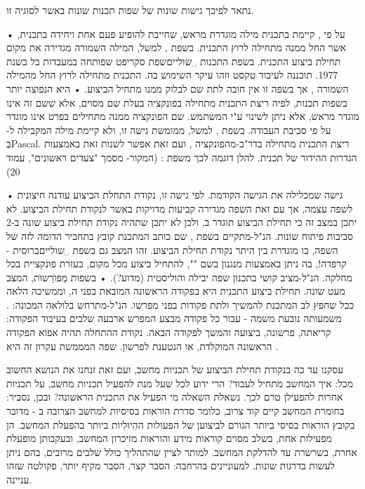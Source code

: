 נתאר לפיכך גישות שונות של שפות תכנות שונות באשר לסוגיה זו.
\begin{enumerate}
• על פי , קיימת בתכנית מילה מוגדרת מראש, שחייבת להופיע פעם אחת ויחידה בתכנית, אשר החל ממנה מתחילה לרוץ התכנית. בשפת , למשל, המילה השמורה  מגדירה את מקום תחילת ביצוע התכנית. בשפת התכנות ␣שוליים{שפת סקריפט שפותחה במעבדות בל בשנת 1977. תוכננה לעיבוד טקסט וזהו עיקר השימוש בה.} התכנית מתחילה לרוץ החל מהמילה השמורה , אך בשפה זו אין חובה לתת שם לבלוק ממנו מתחיל הביצוע.
•   היא הנפוצה יותר בשפות תכנות, לפיה ריצת התכנית מתחילה בפונקציה בעלת שם מסוים, אלא ששם זה אינו מוגדר מראש, אלא ניתן לשינוי ע"י המשתמש. שם הפונקציה ממנה מתחילים
בפרט אינו מוגדר על פי סביבת העבודה. בשפת , למשל, ממומשת גישה זו, ולא קיימת מילה המקבילה
ל- בְּPascal. ריצת התכנית מתחילה בדר"כ-מהפונקציה , ועם זאת אפשר לשנות זאת באמצעות
הגדרות ההידור של תכנית. להלן דוגמה לכך משפת : (המקור- מסמך "צעדים ראשונים", עמוד 20)



•  גישה שמכלילה את הגישה הקודמת. לפי גישה זו, נקודת התחלת הביצוע עודנה חיצונית לשפה עצמה, אך עם זאת השפה מגדירה קביעות מדויקות באשר לנקודת תחילת הביצוע. לא יתכן במצב זה כי תחילת הביצוע תוגדר ב, ולכן לא יתכן שתהיה נקודת תחילת ביצוע שונה ב-2 סביבות פיתוח שונות. הנ"ל-מתקיים בשפת , שם כותב המתכנת קובץ בתחביר הדומה לזה של השפה, בו מוגדרת בין היתר נקודת תחילת הביצוע. זהו המצב גם בשפת ␣שוליים{ברוסית - קרפדה!}, בה ניתן באמצעות מנגנון בשם "", להתחיל ביצוע מכל מקום, בעזרת פונקציית  בכל מחלקה. הנ"ל-מציב קושי בתכנון שפה יבילה והוליסטית (מדוע?).
•  בשפות מֵפוׂרַשוׂת, המצב מעט שונה. תחילת ביצוע התכנית היא בפקודה הראשונה המובאת בפני ה, וממשיכה הלאה ככל שחפץ לב המתכנת להמשיך ולתת פקודות בפני מפרשו. הנ"ל-מתרחש בלולאה המכונה: . משמעותה נובעת משמה - עבור כל פקודה מבצע המפרש ארבעה שלבים בעיבוד הפקודה: קריאתה, פרשונה, ביצועה והמשך לפקודה הבאה. נקודת ההתחלה תהיה אפוא הפקודה הראשונה המוקלדת, או הנטענת לפרשון. שפה המממשת עקרון זה היא .
\end{enumerate}

עסקנו עד כה בנקודת תחילת הביצוע של תכניות מחשב, ועם זאת זנחנו את הנושא החשוב מכל: איך המחשב מתחיל לעבוד? הרי ידוע לכל שעל מנת להפעיל תכניות מחשב, על תכניות אחרות להפעילן טרם לכך. נשאלת השאלה מי הפעיל את התכנית הראשונה? ובכן, נסביר: בחומרת המחשב קיים קוד צרוב, כלומר סדרת הוראות בסיסיות למחשב הצרובה ב - מדובר בקובץ הוראות בסיסי ביותר הגורם לביצוען של הפעולות ההִיוּלִיוֹת ביותר בהפעלת המחשב. הן מפעילות אחת, בשלב מסוים קוראות מידע והוראות מזיכרון המחשב, ובעקבותן מופעלת אחרת, בשרשרת עד להדלקת המחשב. למותר לציין שהתהליך כולל שלבים מרובים, בהם ניתן לעשות בדרגות שונות. למעוניינים בהרחבה: הסבר קצר, הסבר מקיף יותר, פקולטה שזהו עניינה.

